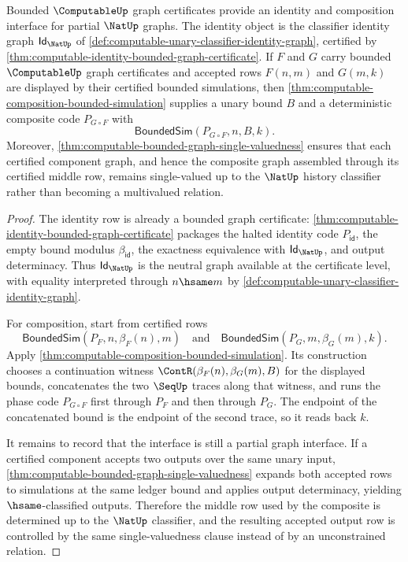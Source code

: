\begin{theorem}
\label{thm:computable-bounded-graph-identity-composition-interface}
Bounded $\ComputableUp$ graph certificates provide an identity and composition interface for partial $\NatUp$ graphs. The identity object is the classifier identity graph $\mathsf{Id}_{\NatUp}$ of \autoref{def:computable-unary-classifier-identity-graph}, certified by \autoref{thm:computable-identity-bounded-graph-certificate}. If $F$ and $G$ carry bounded $\ComputableUp$ graph certificates and accepted rows $F(n,m)$ and $G(m,k)$ are displayed by their certified bounded simulations, then \autoref{thm:computable-composition-bounded-simulation} supplies a unary bound $B$ and a deterministic composite code $P_{G\circ F}$ with
$$
  \mathsf{BoundedSim}(P_{G\circ F},n,B,k).
$$
Moreover, \autoref{thm:computable-bounded-graph-single-valuedness} ensures that each certified component graph, and hence the composite graph assembled through its certified middle row, remains single-valued up to the $\NatUp$ history classifier rather than becoming a multivalued relation.
\end{theorem}
\begin{proof}
The identity row is already a bounded graph certificate: \autoref{thm:computable-identity-bounded-graph-certificate} packages the halted identity code $P_{\mathsf{id}}$, the empty bound modulus $\beta_{\mathsf{id}}$, the exactness equivalence with $\mathsf{Id}_{\NatUp}$, and output determinacy. Thus $\mathsf{Id}_{\NatUp}$ is the neutral graph available at the certificate level, with equality interpreted through $n\hsame m$ by \autoref{def:computable-unary-classifier-identity-graph}.

For composition, start from certified rows
$$
  \mathsf{BoundedSim}(P_F,n,\beta_F(n),m)
  \quad\text{and}\quad
  \mathsf{BoundedSim}(P_G,m,\beta_G(m),k).
$$
Apply \autoref{thm:computable-composition-bounded-simulation}. Its construction chooses a continuation witness $\ContR(\beta_F(n),\beta_G(m),B)$ for the displayed bounds, concatenates the two $\SeqUp$ traces along that witness, and runs the phase code $P_{G\circ F}$ first through $P_F$ and then through $P_G$. The endpoint of the concatenated bound is the endpoint of the second trace, so it reads back $k$.

It remains to record that the interface is still a partial graph interface. If a certified component accepts two outputs over the same unary input, \autoref{thm:computable-bounded-graph-single-valuedness} expands both accepted rows to simulations at the same ledger bound and applies output determinacy, yielding $\hsame$-classified outputs. Therefore the middle row used by the composite is determined up to the $\NatUp$ classifier, and the resulting accepted output row is controlled by the same single-valuedness clause instead of by an unconstrained relation.
\end{proof}

